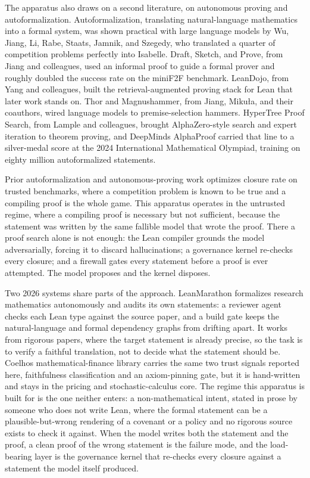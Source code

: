 \documentclass[
  11pt,
]{article}
\renewcommand{\_}{\origunderscore\allowbreak}
\begin{document}
The apparatus also draws on a second literature, on autonomous proving
and autoformalization. Autoformalization, translating natural-language
mathematics into a formal system, was shown practical with large
language models by Wu, Jiang, Li, Rabe, Staats, Jamnik, and Szegedy, who
translated a quarter of competition problems perfectly into Isabelle.
Draft, Sketch, and Prove, from Jiang and colleagues, used an informal
proof to guide a formal prover and roughly doubled the success rate on
the miniF2F benchmark. LeanDojo, from Yang and colleagues, built the
retrieval-augmented proving stack for Lean that later work stands on.
Thor and Magnushammer, from Jiang, Mikuła, and their coauthors, wired
language models to premise-selection hammers. HyperTree Proof Search,
from Lample and colleagues, brought AlphaZero-style search and expert
iteration to theorem proving, and DeepMind\textquotesingle s AlphaProof
carried that line to a silver-medal score at the 2024 International
Mathematical Olympiad, training on eighty million autoformalized
statements.

Prior autoformalization and autonomous-proving work optimizes closure
rate on trusted benchmarks, where a competition problem is known to be
true and a compiling proof is the whole game. This apparatus operates in
the untrusted regime, where a compiling proof is necessary but not
sufficient, because the statement was written by the same fallible model
that wrote the proof. There a proof search alone is not enough: the Lean
compiler grounds the model adversarially, forcing it to discard
hallucinations; a governance kernel re-checks every closure; and a
firewall gates every statement before a proof is ever attempted. The
model proposes and the kernel disposes.

Two 2026 systems share parts of the approach. LeanMarathon formalizes
research mathematics autonomously and audits its own statements: a
reviewer agent checks each Lean type against the source paper, and a
build gate keeps the natural-language and formal dependency graphs from
drifting apart. It works from rigorous papers, where the target
statement is already precise, so the task is to verify a faithful
translation, not to decide what the statement should be.
Coelho\textquotesingle s mathematical-finance library carries the same
two trust signals reported here, faithfulness classification and an
axiom-pinning gate, but it is hand-written and stays in the pricing and
stochastic-calculus core. The regime this apparatus is built for is the
one neither enters: a non-mathematical intent, stated in prose by
someone who does not write Lean, where the formal statement can be a
plausible-but-wrong rendering of a covenant or a policy and no rigorous
source exists to check it against. When the model writes both the
statement and the proof, a clean proof of the wrong statement is the
failure mode, and the load-bearing layer is the governance kernel that
re-checks every closure against a statement the model itself produced.
\end{document}
